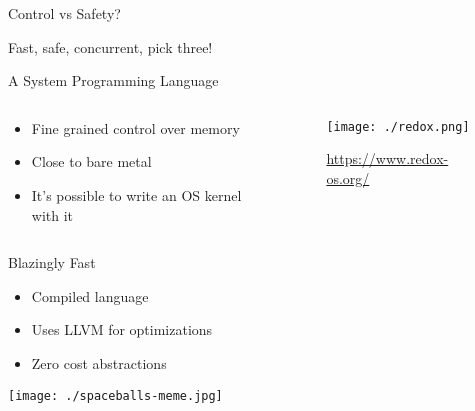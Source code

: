 \documentclass[aspectratio=1610,t]{beamer}
\begin{document}
\begin{frame}[c]{Control vs Safety?}
  \begin{center}
    \pause

    \pause \huge{Fast, safe, concurrent, pick three!}
  \end{center}
\end{frame}


\begin{frame}[c]{A System Programming Language}
  \begin{columns}[onlytextwidth]
    \begin{column}{.4\textwidth}
      \begin{itemize}
        \item Fine grained control over memory
        \item Close to bare metal
        \item It's possible to write an OS kernel with it
      \end{itemize}
    \end{column}
    \begin{column}{.6\textwidth}
      \begin{figure}
        \texttt{[image: ./redox.png]}
        \caption{\url{https://www.redox-os.org/}}
      \end{figure}
    \end{column}
  \end{columns}
\end{frame}


\begin{frame}[c]{Blazingly Fast}
  \begin{itemize}
    \item Compiled language
    \item Uses LLVM for optimizations
    \item Zero cost abstractions
  \end{itemize}
  \texttt{[image: ./spaceballs-meme.jpg]}
\end{frame}
\end{document}
